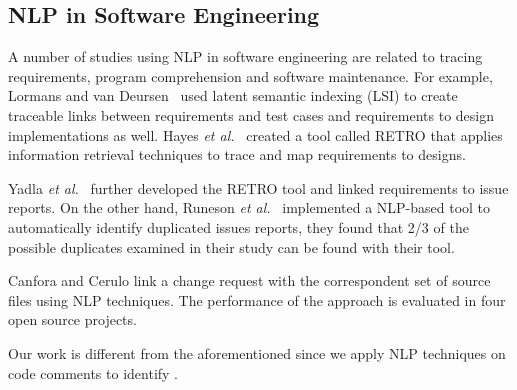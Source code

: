 \subsection{NLP in Software Engineering}

A number of studies using NLP in software engineering are related to tracing requirements, program comprehension and software maintenance. 
For example, Lormans and van Deursen~\cite{Lormans2006CSRM} used latent semantic indexing (LSI) to create traceable links between requirements and test cases and requirements to design implementations as well. Hayes \textit{et al.}~\cite{Hayes2005, Hayes2006TSE} created a tool called RETRO that applies information retrieval techniques to trace and map requirements to designs. 

Yadla \textit{et al.}~\cite{yadla2005tracing} further developed the RETRO tool and linked requirements to issue reports. On the other hand, Runeson \textit{et al.}~\cite{Runeson2007ICSE} implemented a NLP-based tool to automatically identify duplicated issues reports, they found that 2/3 of the possible duplicates examined in their study can be found with their tool. 

Canfora and Cerulo \cite{Canfora2005ISSM} link a change request with the correspondent set of source files using NLP techniques. The performance of the approach is evaluated in four open source projects.  

Our work is different from the aforementioned since we apply NLP techniques on code comments to identify \SATD.